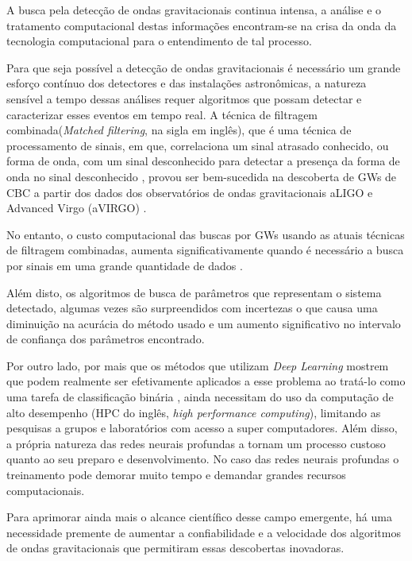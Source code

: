 A busca pela detecção de ondas gravitacionais continua intensa, a análise e o tratamento computacional destas informações encontram-se na crisa da onda da tecnologia computacional para o entendimento de tal processo.

Para que seja possível a detecção de ondas gravitacionais é necessário um grande esforço contínuo dos detectores e das instalações astronômicas, a natureza sensível a tempo dessas análises requer algoritmos que possam detectar e caracterizar esses eventos em tempo real. A técnica de filtragem combinada(\textit{Matched filtering}, na sigla em inglês), que é uma técnica de processamento de sinais, em que, correlaciona um sinal atrasado conhecido, ou forma de onda, com um sinal desconhecido para detectar a presença da forma de onda no sinal desconhecido \cite{turin1960introduction, Schutz_1999}, provou ser bem-sucedida na descoberta de GWs de CBC a partir dos dados dos observatórios de ondas gravitacionais aLIGO e Advanced Virgo (aVIRGO) \cite{gebhard2019convolutional}.

No entanto, o custo computacional das buscas por GWs usando as atuais técnicas de filtragem combinadas, aumenta significativamente quando é necessário a busca por sinais em uma grande quantidade de dados \cite{abbott2018prospects}.

Além disto, os algoritmos de busca de parâmetros que  representam o sistema detectado, algumas vezes são surpreendidos com incertezas o que causa uma diminuição na acurácia do método usado e um aumento significativo no intervalo de confiança dos parâmetros encontrado.

Por outro lado, por mais que os métodos que utilizam \textit{Deep Learning} mostrem que podem realmente ser efetivamente aplicados a esse problema ao tratá-lo como uma tarefa de classificação binária \cite{gebhard2019convolutional}, ainda necessitam do uso da computação de alto desempenho (HPC do inglês, \textit{high performance computing}), limitando as pesquisas a grupos e laboratórios com acesso a super computadores. Além disso, a própria natureza das redes neurais profundas a tornam um processo custoso quanto ao seu preparo e desenvolvimento. No caso das redes neurais profundas o treinamento pode demorar muito tempo e demandar grandes recursos computacionais.

Para aprimorar ainda mais o alcance científico desse campo emergente, há uma necessidade premente de aumentar a confiabilidade e a velocidade dos algoritmos de ondas gravitacionais que permitiram essas descobertas inovadoras.

